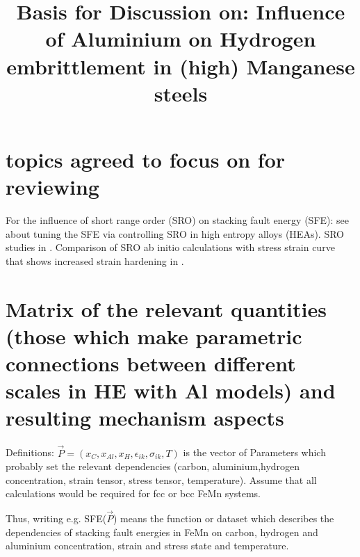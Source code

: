 \documentclass[11pt,floatfix,showpacs]{amsart}
\newcommand{\se}{\section}
\begin{document}
\title{Basis for Discussion on: Influence of Aluminium on Hydrogen embrittlement in (high) Manganese steels}

 
\se{topics agreed to focus on for reviewing}
For the influence of short range order (SRO) on stacking fault energy (SFE): see \cite{ding2018tunable} about tuning the SFE via controlling SRO in high entropy alloys (HEAs).
SRO studies in \cite{von2011carbon}.
Comparison of SRO ab initio calculations with stress strain curve that shows increased strain hardening in \cite{song2018mn}.
 
 
\se{Matrix of the relevant quantities (those which make parametric connections between different scales in HE with Al models) and resulting mechanism aspects} 

Definitions: $\vec{P} = (x_C,x_{Al},x_H,\epsilon_{ik},\sigma_{ik},T)$ is the vector of Parameters which probably set the relevant dependencies (carbon, aluminium,hydrogen concentration, strain tensor, stress tensor, temperature). Assume that all calculations would be required for fcc or bcc FeMn systems.   

Thus, writing e.g. SFE($\vec{P}$) means the function or dataset which describes the dependencies of stacking fault energies 
in FeMn on carbon, hydrogen and aluminium concentration, strain and stress state and temperature. 

\end{document}
